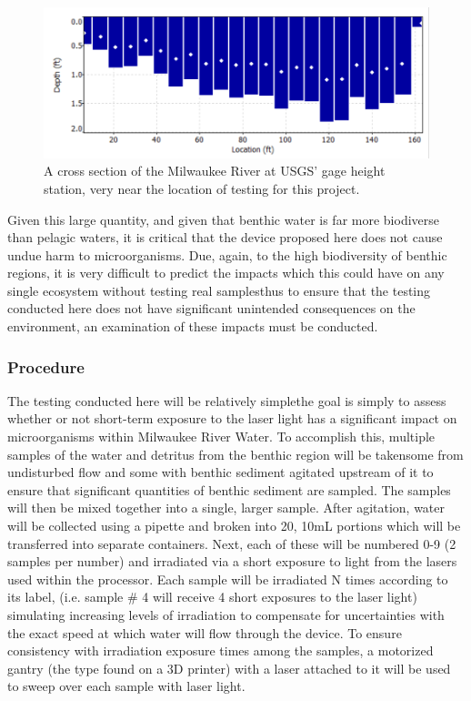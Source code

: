 \documentclass[fleqn,10pt]{SelfArx} %
\begin{document}
		\begin{figure}[h]
		\centering
		\includegraphics[width=1\linewidth]{Figures/RiverCrosssection}
		\caption[River Cross Section]{A cross section of the Milwaukee River at USGS' gage height station, very near the location of testing for this project.}
		\label{fig:riverCrosssec}
	\end{figure}
	
	Given this large quantity, and given that benthic water is far more biodiverse than pelagic waters, it is critical that the device proposed here does not cause undue harm to microorganisms. Due, again, to the high biodiversity of benthic regions, it is very difficult to predict the impacts which this could have on any single ecosystem without testing real samples\textemdash thus to ensure that the testing conducted here does not have significant unintended consequences on the environment, an examination of these impacts must be conducted. 
	
	\subsubsection{Procedure}
	The testing conducted here will be relatively simple\textemdash the goal is simply to assess whether or not short-term exposure to the laser light has a significant impact on microorganisms within Milwaukee River Water. To accomplish this, multiple samples of the water and detritus from the benthic region will be taken\textemdash some from undisturbed flow and some with benthic sediment agitated upstream of it to ensure that significant quantities of benthic sediment are sampled. The samples will then be mixed together into a single, larger sample. After agitation, water will be collected using a pipette and broken into 20, 10mL portions which will be transferred into separate containers. 
	Next, each of these will be numbered 0-9 (2 samples per number) and irradiated via a short exposure to light from the lasers used within the processor. Each sample will be irradiated N times according to its label, (i.e. sample \# 4 will receive 4 short exposures to the laser light) simulating increasing levels of irradiation to compensate for uncertainties with the exact speed at which water will flow through the device. To ensure consistency with irradiation exposure times among the samples, a motorized gantry (the type found on a 3D printer) with a laser attached to it will be used to sweep over each sample with laser light.
	
\end{document}
